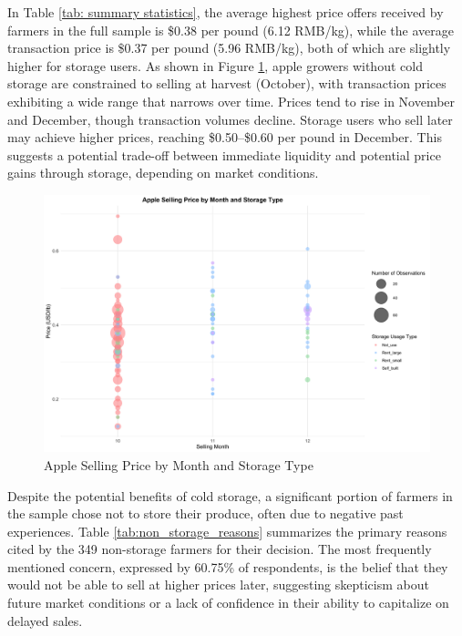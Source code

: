 \documentclass[12pt]{article}
\begin{document}


In Table \ref{tab: summary statistics}, the average highest price offers received by farmers in the full sample is \$0.38 per pound (6.12 RMB/kg), while the average transaction price is \$0.37 per pound (5.96 RMB/kg), both of which are slightly higher for storage users. As shown in Figure \ref{Figure: selling price bubble}, apple growers without cold storage are constrained to selling at harvest (October), with transaction prices exhibiting a wide range that narrows over time. Prices tend to rise in November and December, though transaction volumes decline. Storage users who sell later may achieve higher prices, reaching \$0.50–\$0.60 per pound in December. This suggests a potential trade-off between immediate liquidity and potential price gains through storage, depending on market conditions.

\begin{figure}[H]
\centering
\includegraphics[width=1\textwidth]{figures/apple_price_bubble_plot.png}
\caption{Apple Selling Price by Month and Storage Type}
\label{Figure: selling price bubble}
\end{figure}

Despite the potential benefits of cold storage, a significant portion of farmers in the sample chose not to store their produce, often due to negative past experiences. Table \ref{tab:non_storage_reasons} summarizes the primary reasons cited by the 349 non-storage farmers for their decision. The most frequently mentioned concern, expressed by 60.75\% of respondents, is the belief that they would not be able to sell at higher prices later, suggesting skepticism about future market conditions or a lack of confidence in their ability to capitalize on delayed sales.
\end{document}
